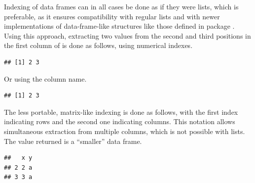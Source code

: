 \documentclass[krantz2]{krantz}\usepackage{knitr}
\begin{document}
\begin{explainbox}
Indexing of data frames can in all cases be done as if they were lists, which is preferable, as it ensures compatibility with regular \Rlang lists and with newer implementations of data-frame-like structures like those defined in package . Using this approach, extracting two values from the second and third positions in the first column of  is done as follows, using numerical indexes.

\begin{knitrout}\footnotesize
{}\color{fgcolor}\begin{kframe}
\begin{alltt}
\hlstd{a.df[[}\hlstd{]][}\hlopt{:}\hlstd{]}
\end{alltt}
\begin{verbatim}
## [1] 2 3
\end{verbatim}
\end{kframe}
\end{knitrout}

Or using the column name.

\begin{knitrout}\footnotesize
{}\color{fgcolor}\begin{kframe}
\begin{alltt}
\hlstd{a.df[[}\hlstd{]][}\hlopt{:}\hlstd{]}
\end{alltt}
\begin{verbatim}
## [1] 2 3
\end{verbatim}
\end{kframe}
\end{knitrout}

The less portable, matrix-like indexing is done as follows, with the first index indicating rows and the second one indicating columns. This notation allows simultaneous extraction from multiple columns, which is not possible with lists. The value returned is a ``smaller'' data frame.

\begin{knitrout}\footnotesize
{}\color{fgcolor}\begin{kframe}
\begin{alltt}
\hlstd{a.df[}\hlopt{:}\hlstd{,} \hlopt{:}\hlstd{]}
\end{alltt}
\begin{verbatim}
##   x y
## 2 2 a
## 3 3 a
\end{verbatim}
\end{kframe}
\end{knitrout}


\end{explainbox}
\end{document}
